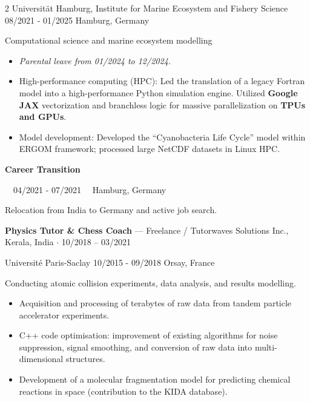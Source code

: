 \documentclass{thejus_cv}
\begin{document}
\begin{paracol}{2}
             {Universit\"at Hamburg, Institute for Marine Ecosystem and Fishery Science}
             {08/2021 - 01/2025}
             {Hamburg, Germany}
             {Computational science and marine ecosystem modelling
             \begin{itemize}\setlength{\itemsep}{0.05em}
                 \item \textit{Parental leave from 01/2024 to 12/2024.}
                 \item High-performance computing (HPC): Led the translation of a legacy Fortran model into a high-performance Python simulation engine. Utilized \textbf{Google JAX} vectorization and branchless logic for massive parallelization on \textbf{TPUs and GPUs}.
                 \item Model development: Developed the ``Cyanobacteria Life Cycle'' model within ERGOM framework; processed large NetCDF datasets in Linux HPC.
             \end{itemize}}

\vspace{0.8em}
{\large\textbf{Career Transition}}\par
{\small\color{cvgray}\faCalendar\ \ 04/2021 - 07/2021 \hspace{0.5cm} \faMapMarker\ \ Hamburg, Germany}\par
\vspace{0.2em}
{\color{cvlightgray}\hdashrule{\linewidth}{0.5pt}{1mm}}\par
\vspace{0.2em}
Relocation from India to Germany and active job search.
\vspace{0.3em}

\textbf{Physics Tutor \& Chess Coach} --- Freelance / Tutorwaves Solutions Inc., Kerala, India $\cdot$ 10/2018 -- 03/2021\par

             {Universit\'e Paris-Saclay}
             {10/2015 - 09/2018}
             {Orsay, France}
             {Conducting atomic collision experiments, data analysis, and results modelling.
             \begin{itemize}
                 \item Acquisition and processing of terabytes of raw data from tandem particle accelerator experiments.
                 \item C++ code optimisation: improvement of existing algorithms for noise suppression, signal smoothing, and conversion of raw data into multi-dimensional structures.
                 \item Development of a molecular fragmentation model for predicting chemical reactions in space (contribution to the KIDA database).
             \end{itemize}}



\end{paracol}
\end{document}
